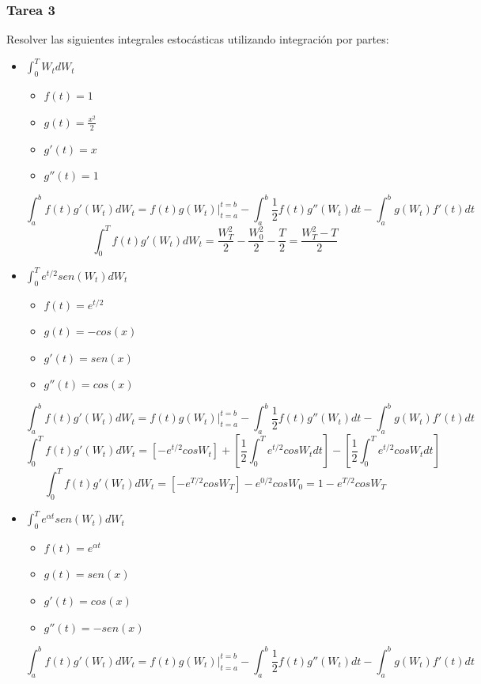 \documentclass[11pt,fleqn]{book} %
\numberwithin{equation}{section} %
\numberwithin{figure}{section} %
\numberwithin{table}{section} %
\begin{document}
\subsubsection{Tarea 3}
Resolver las siguientes integrales estocásticas utilizando integración por partes:
\begin{itemize}
    \item $\int_{0}^{T} W_{t} dW_{t}   $
        \begin{itemize}
            \item $f(t) = 1 $
            \item $g(t) = \frac{x^{2}}{2} $
            \item $g'(t) = x $
            \item $g''(t) = 1 $
        \end{itemize}
    $$\int^{b}_{a} f(t)g'(W_t)dW_t= f(t)g(W_t)|^{t=b}_{t=a}-\int^{b}_{a} \frac{1}{2}f(t)g''(W_t)dt-\int^{b}_{a} g(W_t)f'(t)dt$$
    $$ \int_{0}^{T} f(t)g'(W_t)dW_t= \frac{W_{T}^{2}}{2} - \frac{W_{0}^{2}}{2} - \frac{T}{2} = \frac{W_{T}^{2}-T}{2} $$
    \item $\int_{0}^{T} e^{t/2} sen(W_{t}) dW_{t}   $
        \begin{itemize}
            \item $f(t) = e^{t/2} $
            \item $g(t) = -cos(x)$
            \item $g'(t) = sen(x)$
            \item $g''(t) = cos(x)$
        \end{itemize}
    $$\int^{b}_{a} f(t)g'(W_t)dW_t= f(t)g(W_t)|^{t=b}_{t=a}-\int^{b}_{a} \frac{1}{2}f(t)g''(W_t)dt-\int^{b}_{a} g(W_t)f'(t)dt$$
    $$ \int^{T}_{0} f(t)g'(W_t)dW_t= [-e^{t/2} cosW_{t}] + [\frac{1}{2} \int^{T}_{0} e^{t/2} cosW_{t} dt ] - [\frac{1}{2} \int_{0}^{T} e^{t/2} cosW_{t} dt] $$
    $$ \int^{T}_{0} f(t)g'(W_t)dW_t= [-e^{T/2} cosW_{T}] -e^{0/2} cosW_{0}  = 1 -e^{T/2} cosW_{T}$$
    \item $\int_{0}^{T} e^{\alpha t} sen(W_{t}) dW_{t}   $
        \begin{itemize}
            \item $f(t) = e^{\alpha t} $
            \item $g(t) = sen(x)$
            \item $g'(t) = cos(x)$
            \item $g''(t) = -sen(x)$
        \end{itemize}
    $$\int^{b}_{a} f(t)g'(W_t)dW_t= f(t)g(W_t)|^{t=b}_{t=a}-\int^{b}_{a} \frac{1}{2}f(t)g''(W_t)dt-\int^{b}_{a} g(W_t)f'(t)dt$$

\end{itemize}
\end{document}
